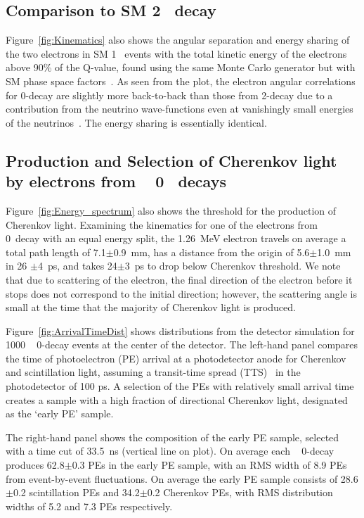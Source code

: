 \subsection{Comparison to SM 2\nbb~ decay}
\label{comparison}

Figure~\ref{fig:Kinematics} also shows the angular separation and
energy sharing of the two electrons in SM 1\nbb~ events with the total kinetic
energy of the electrons above 90\% of the Q-value, found using the
same Monte Carlo generator but with SM phase space
factors~\cite{Jenni}.  As seen from the plot, the electron angular
correlations for 0\nbb-decay are slightly more back-to-back than those
from 2\nbb-decay due to a contribution from the neutrino
wave-functions even at vanishingly small energies of the
neutrinos~\cite{Jenni}. The energy sharing is essentially
identical.

\subsection{Production and Selection 
of Cherenkov light by electrons from \Te~ 0\nbb~ decays}
Figure~\ref{fig:Energy_spectrum} also shows the threshold for the
production of Cherenkov light.
Examining the kinematics for one of the electrons from \Te~
0\nbb~decay with an equal energy split, the 1.26~MeV electron travels
on average a total path length of 7.1$\pm$0.9~mm, has a distance from
the origin of 5.6$\pm$1.0~mm in 26 $\pm$4~ps, and takes
24$\pm$3~ps to drop below Cherenkov threshold.  We note that due
to scattering of the electron, the final direction of the electron
before it stops does not correspond to the initial direction; however,
the scattering angle is small at the time that the majority of
Cherenkov light is produced.

Figure~\ref{fig:ArrivalTimeDist} shows distributions from the detector
simulation for 1000 \Te~ 0\nbb-decay events at the center of the
detector. The left-hand panel compares the time of photoelectron (PE)
arrival at a photodetector anode for Cherenkov and scintillation
light, assuming a transit-time spread (TTS)~\cite{TTS} in the
photodetector of 100 ps.  A selection of the PEs with relatively small
arrival time creates a sample with a high fraction of directional
Cherenkov light, designated as the `early PE' sample.

The right-hand panel shows the composition of the early PE sample,
selected with a time cut of 33.5~ns (vertical line on plot). On
average each \Te~ 0\nbb-decay produces 62.8$\pm$0.3 PEs in the early
PE sample, with an RMS width of 8.9 PEs from event-by-event
fluctuations.  On average the early PE sample consists of 28.6$\pm$0.2
scintillation PEs and 34.2$\pm$0.2 Cherenkov PEs, with RMS
distribution widths of 5.2 and 7.3 PEs respectively.


